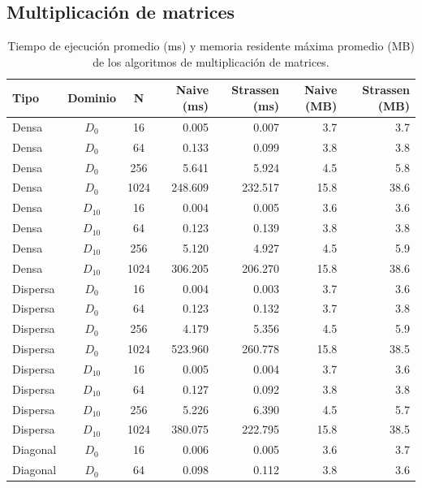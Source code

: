 \subsection{Multiplicación de matrices}

\begin{table}[htbp]
\centering
\caption{Tiempo de ejecución promedio (ms) y memoria residente máxima promedio (MB) de los algoritmos de multiplicación de matrices.}
\vspace{0.2cm}
\small
\begin{tabular}{|l|c|c|r|r|r|r|}
\hline
\textbf{Tipo} & \textbf{Dominio} & \textbf{N} & \textbf{Naive (ms)} & \textbf{Strassen (ms)} & \textbf{Naive (MB)} & \textbf{Strassen (MB)} \\ \hline
Densa & $D_{0}$ & 16 & 0.005 & 0.007 & 3.7 & 3.7 \\ \hline
Densa & $D_{0}$ & 64 & 0.133 & 0.099 & 3.8 & 3.8 \\ \hline
Densa & $D_{0}$ & 256 & 5.641 & 5.924 & 4.5 & 5.8 \\ \hline
Densa & $D_{0}$ & 1024 & 248.609 & 232.517 & 15.8 & 38.6 \\ \hline
Densa & $D_{10}$ & 16 & 0.004 & 0.005 & 3.6 & 3.6 \\ \hline
Densa & $D_{10}$ & 64 & 0.123 & 0.139 & 3.8 & 3.8 \\ \hline
Densa & $D_{10}$ & 256 & 5.120 & 4.927 & 4.5 & 5.9 \\ \hline
Densa & $D_{10}$ & 1024 & 306.205 & 206.270 & 15.8 & 38.6 \\ \hline
Dispersa & $D_{0}$ & 16 & 0.004 & 0.003 & 3.7 & 3.6 \\ \hline
Dispersa & $D_{0}$ & 64 & 0.123 & 0.132 & 3.7 & 3.8 \\ \hline
Dispersa & $D_{0}$ & 256 & 4.179 & 5.356 & 4.5 & 5.9 \\ \hline
Dispersa & $D_{0}$ & 1024 & 523.960 & 260.778 & 15.8 & 38.5 \\ \hline
Dispersa & $D_{10}$ & 16 & 0.005 & 0.004 & 3.7 & 3.6 \\ \hline
Dispersa & $D_{10}$ & 64 & 0.127 & 0.092 & 3.8 & 3.8 \\ \hline
Dispersa & $D_{10}$ & 256 & 5.226 & 6.390 & 4.5 & 5.7 \\ \hline
Dispersa & $D_{10}$ & 1024 & 380.075 & 222.795 & 15.8 & 38.5 \\ \hline
Diagonal & $D_{0}$ & 16 & 0.006 & 0.005 & 3.6 & 3.7 \\ \hline
Diagonal & $D_{0}$ & 64 & 0.098 & 0.112 & 3.8 & 3.6 \\ \hline

\end{tabular}
\end{table}
